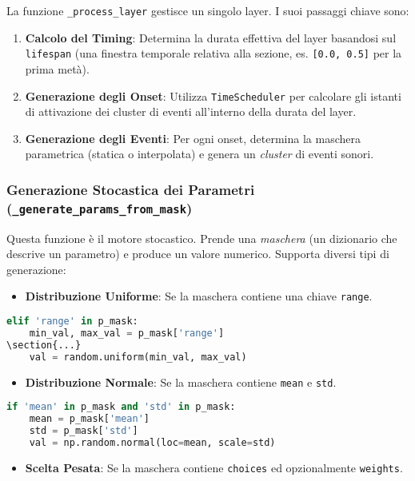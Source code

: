 La funzione \texttt{\_process\_layer} gestisce un singolo layer. I suoi passaggi chiave sono:
\begin{enumerate}
    \item \textbf{Calcolo del Timing}: Determina la durata effettiva del layer basandosi sul \texttt{lifespan} (una finestra temporale relativa alla sezione, es. \texttt{[0.0, 0.5]} per la prima metà).
    \item \textbf{Generazione degli Onset}: Utilizza \texttt{TimeScheduler} per calcolare gli istanti di attivazione dei cluster di eventi all'interno della durata del layer.
    \item \textbf{Generazione degli Eventi}: Per ogni onset, determina la maschera parametrica (statica o interpolata) e genera un \textit{cluster} di eventi sonori.
\end{enumerate}
\subsubsection{Generazione Stocastica dei Parametri (\texttt{\_generate\_params\_from\_mask})}
Questa funzione è il motore stocastico. Prende una \textit{maschera} (un dizionario che descrive un parametro) e produce un valore numerico. Supporta diversi tipi di generazione:

\begin{itemize}
 \item \textbf{Distribuzione Uniforme}: Se la maschera contiene una chiave \texttt{range}.
\end{itemize}

\begin{lstlisting}[language=Python]
elif 'range' in p_mask:
    min_val, max_val = p_mask['range']
\section{...}
    val = random.uniform(min_val, max_val)
\end{lstlisting}
\begin{itemize}
 \item \textbf{Distribuzione Normale}: Se la maschera contiene \texttt{mean} e \texttt{std}.
\end{itemize}

\begin{lstlisting}[language=Python]
if 'mean' in p_mask and 'std' in p_mask:
    mean = p_mask['mean']
    std = p_mask['std']
    val = np.random.normal(loc=mean, scale=std)
\end{lstlisting}
\begin{itemize}
 \item \textbf{Scelta Pesata}: Se la maschera contiene \texttt{choices} ed opzionalmente \texttt{weights}.
\end{itemize}

